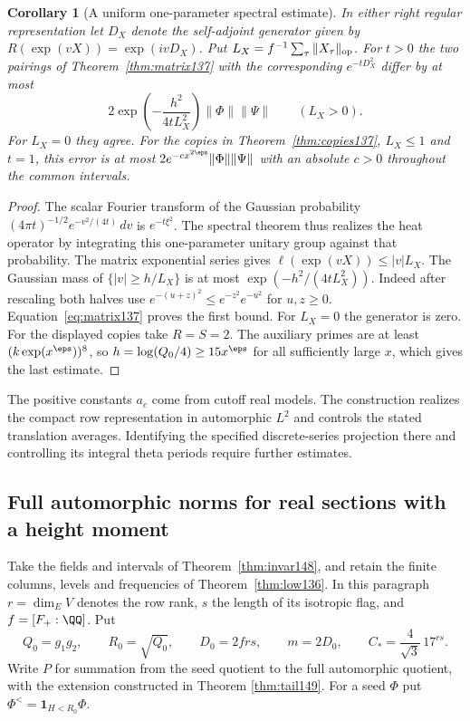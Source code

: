 \documentclass[a4paper,11pt]{article}
\newtheorem{corollary}[proposition]{Corollary}
\theoremstyle{definition}
\theoremstyle{remark}
\numberwithin{equation}{section}
\begin{document}
\begin{corollary}[A uniform one-parameter spectral estimate]
\label{cor:heat137}
In either right regular representation let \(D_X\) denote the
self-adjoint generator given by \(R(\exp(vX))=\exp(ivD_X)\).
Put \(L_X=f^{-1}\sum_\tau\|X_\tau\|_{\rm op}\).
For \(t>0\) the two pairings of Theorem~\ref{thm:matrix137}
with the corresponding \(e^{-tD_X^2}\) differ by at most
\[
    2\exp\!\left(-\frac{h^2}{4tL_X^2}\right)\|\Phi\|\|\Psi\|
                    \qquad (L_X>0).
\]
For \(L_X=0\) they agree. For the copies in
Theorem~\ref{thm:copies137}, \(L_X\le1\) and \(t=1\), this
error is at most \(2e^{-c x^{2\eps}}\|\Phi\|\|\Psi\|\) with an
absolute \(c>0\) throughout the common intervals.
\end{corollary}
\begin{proof}
The scalar Fourier transform of the Gaussian probability
\((4\pi t)^{-1/2}e^{-v^2/(4t)}\,dv\) is \(e^{-t\xi^2}\).
The spectral theorem thus realizes the heat operator by
integrating this one-parameter unitary group against that
probability. The matrix exponential series gives
\(\ell(\exp(vX))\le |v|L_X\). The Gaussian mass of
\(\{|v|\ge h/L_X\}\) is at most \(\exp(-h^2/(4tL_X^2))\).
Indeed after rescaling both halves use
\(e^{-(u+z)^2}\le e^{-z^2}e^{-u^2}\) for \(u,z\ge0\).
Equation~\eqref{eq:matrix137} proves the first bound.
For \(L_X=0\) the generator is zero. For the displayed copies
take \(R=S=2\). The auxiliary primes are at least
\((k\exp(x^\eps))^8\), so \(h=\log(Q_0/4)\ge 15x^\eps\)
for all sufficiently large \(x\), which gives the last estimate.
\end{proof}

The positive constants \(a_c\) come from cutoff real models.
The construction realizes the compact row representation
in automorphic \(L^2\) and controls the stated translation
averages. Identifying the specified discrete-series projection
there and controlling its integral theta periods require further
estimates.

\subsection{Full automorphic norms for real sections with a height moment}\label{nav:VII-22}
Take the fields and intervals of Theorem~\ref{thm:invar148},
and retain the finite columns, levels and frequencies of
Theorem~\ref{thm:low136}. In this paragraph \(r=\dim_E V\)
denotes the row rank, \(s\) the length of its isotropic flag,
and \(f=[F_+:\QQ]\). Put
\[
 Q_0=g_1g_2,\qquad R_0=\sqrt{Q_0},\qquad D_0=2frs,
 \qquad m=2D_0,\qquad C_*=\frac{4}{\sqrt3}\,17^{rs}.
\]
Write \(P\) for summation from the seed quotient to the full
automorphic quotient, with the extension constructed in
Theorem \ref{thm:tail149}.
For a seed \(\Phi\) put \(\Phi^{<}=\mathbf1_{H<R_0}\Phi\).
\end{document}
